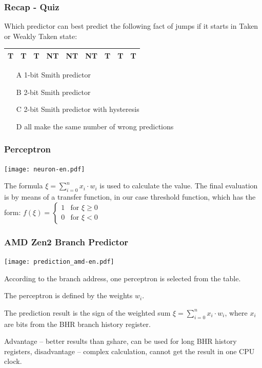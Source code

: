 \documentclass{beamer}
\begin{document}
\begin{frame}
\frametitle{Recap - Quiz}

Which predictor can best predict the following fact of jumps if it starts in Taken or Weakly Taken state:

\begin{tabular}{|c|c|c|c|c|c|c|c|c|}\hline
T & T & T & NT & NT & NT& T & T & T \\ \hline
\end{tabular}

\bigskip
\begin{itemize}
 \item[A] 1-bit Smith predictor
 \item[B] 2-bit Smith predictor
 \item[C] 2-bit Smith predictor with hysteresis
 \item[D] all make the same number of wrong predictions
\end{itemize}
\end{frame}


\begin{frame}
\frametitle{Perceptron}

\begin{center}
\texttt{[image: neuron-en.pdf]}
\end{center}

The formula $\xi = \sum_{i=0}^{n} x_i \cdot w_i$ is used to calculate the value. The final evaluation is by means of a transfer function, in our case threshold function, which has the form:
$f(\xi) = \begin{cases}1& \text{for }\xi \ge 0\\0& \text{for }\xi <0\end{cases}$
\end{frame}


\begin{frame}
\frametitle{AMD Zen2 Branch Predictor}

\begin{center}
\texttt{[image: prediction\_amd-en.pdf]}
\end{center}

According to the branch address, one perceptron is selected from the table.

The perceptron is defined by the weights $w_i$.

The prediction result is the sign of the weighted sum $\xi = \sum_{i=0}^{n} x_i \cdot w_i$, where $x_i$ are bits from the BHR branch history register.

Advantage -- better results than gshare, can be used for long BHR history registers, disadvantage -- complex calculation, cannot get the result in one CPU clock.
\end{frame}
\end{document}
